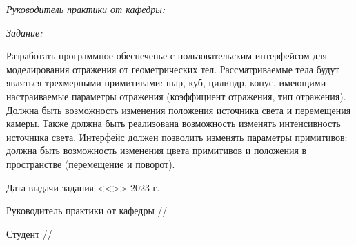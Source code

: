 \documentclass[a4paper,14pt,unknownkeysallowed]{extreport}
\begin{document}


\noindent \textit{Руководитель практики от кафедры:}

\noindent {}

\vspace{0.3cm}

\noindent \textit{Задание:}

Разработать программное обеспеченье с пользовательским интерфейсом для моделирования отражения от геометрических тел. 
Рассматриваемые тела будут являться трехмерными примитивами: шар, куб, цилиндр, конус, имеющими настраиваемые параметры отражения (коэффициент отражения, тип отражения). 
Должна быть возможность изменения положения источника света и перемещения камеры. 
Также должна быть реализована возможность изменять интенсивность источника света. 
Интерфейс должен позволить изменять параметры примитивов: должна быть возможность изменения цвета примитивов и положения в пространстве (перемещение и поворот).


\vfill

\noindent Дата выдачи задания <<>> 2023 г.

\vspace{1cm}



\noindent Руководитель практики от кафедры \hfill \ulinetext[2cm]{}{}//

\vspace{0.3cm}

\noindent Студент \hfill \ulinetext[2cm]{}{}//

\vfill

\thispagestyle{empty} 





\renewcommand{\contentsname}{Содержание} 
\tableofcontents
\end{document}
